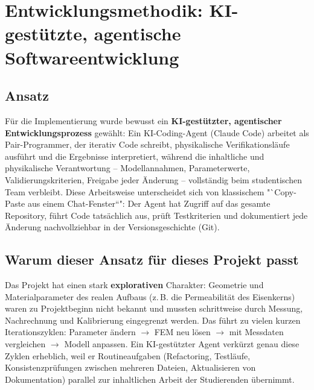 \documentclass[a4paper,11pt]{article}
\begin{document}
\section{Entwicklungsmethodik: KI-gestützte, agentische Softwareentwicklung}

\subsection{Ansatz}
Für die Implementierung wurde bewusst ein \textbf{KI-gestützter, agentischer
Entwicklungsprozess} gewählt: Ein KI-Coding-Agent (Claude Code) arbeitet als
Pair-Programmer, der iterativ Code schreibt, physikalische
Verifikationsläufe ausführt und die Ergebnisse interpretiert, während die
inhaltliche und physikalische Verantwortung -- Modellannahmen,
Parameterwerte, Validierungskriterien, Freigabe jeder Änderung -- vollständig
beim studentischen Team verbleibt. Diese Arbeitsweise unterscheidet sich von
klassischem "`Copy-Paste aus einem Chat-Fenster“": Der Agent hat Zugriff auf
das gesamte Repository, führt Code tatsächlich aus, prüft Testkriterien und
dokumentiert jede Änderung nachvollziehbar in der Versionsgeschichte (Git).

\subsection{Warum dieser Ansatz für dieses Projekt passt}
Das Projekt hat einen stark \textbf{explorativen} Charakter: Geometrie und
Materialparameter des realen Aufbaus (z.\,B. die Permeabilität des
Eisenkerns) waren zu Projektbeginn nicht bekannt und mussten schrittweise
durch Messung, Nachrechnung und Kalibrierung eingegrenzt werden. Das führt
zu vielen kurzen Iterationszyklen: Parameter ändern
$\to$ FEM neu lösen $\to$ mit Messdaten vergleichen $\to$ Modell anpassen.
Ein KI-gestützter Agent verkürzt genau diese Zyklen erheblich, weil er
Routineaufgaben (Refactoring, Testläufe, Konsistenzprüfungen zwischen
mehreren Dateien, Aktualisieren von Dokumentation) parallel zur inhaltlichen
Arbeit der Studierenden übernimmt.
\end{document}
